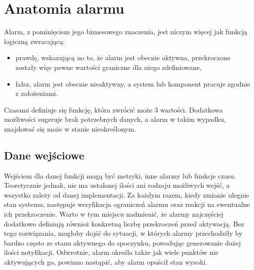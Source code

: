 \section{Anatomia alarmu}
\label{chapter:monitoring:anatomy_of_alarm}

    Alarm, z pominięciem jego biznesowego znaczenia, jest niczym więcej jak funkcją logiczną zwracającą:
    \begin{itemize}
        \item prawdę, wskazującą no to, że alarm jest obecnie aktywna, przekroczone zostały więc
        pewne wartości graniczne dla niego zdefiniowane,
        \item fałsz, alarm jest obecnie nieaktywny, a system lub komponent pracuje zgodnie z założeniami.
    \end{itemize}
    Czasami definiuje się funkcję, która zwrócić może 3 wartości. Dodatkowa możliwości sugeruje brak 
    potrzebnych danych, a alarm w takim wypadku, znajdować się może w stanie nieokreślonym. 
   
    \subsection{Dane wejściowe}
    Wejściem dla danej funkcji mogą być metryki, inne alarmy lub funkcje czasu. Teoretycznie jednak, nie ma ustalonej
    ilości ani rodzaju możliwych wejść, a wszystko zależy od danej implementacji. Za każdym razem, kiedy 
    zmianie ulegnie stan systemu, następuje weryfikacja ograniczeń alarmu oraz reakcji na ewentualne ich
    przekroczenie. Warto w tym miejscu nadmienić, że alarmy najczęściej dodatkowo definiują również 
    konkretną liczbę przekroczeń przed aktywacją. Bez tego rozwiązania, mogłoby dojść do sytuacji, w których
    alarmy przechodziły by bardzo często ze stanu aktywnego do spoczynku, powodując generowanie dużej ilości notyfikacji. Odwrotnie, alarm określa także jak wiele punktów nie aktywujących go, powinno
    nastąpić, aby alarm opuścił stan wysoki.
    
